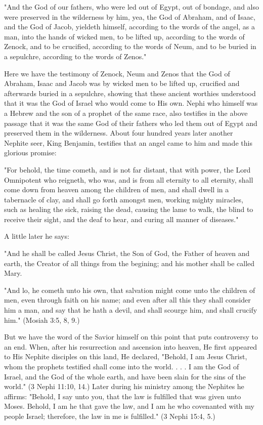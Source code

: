 "And the God of our fathers, who were led out of Egypt, out of bondage, and also were
preserved in the wilderness by him, yea, the God of Abraham, and of Isaac, and the God of
Jacob, yieldeth himself, according to the words of the angel, as a man, into the hands of
wicked men, to be lifted up, according to the words of Zenock, and to be crucified, according
to the words of Neum, and to be buried in a sepulchre, according to the words of Zenos."

Here we have the testimony of Zenock, Neum and Zenos that the God of Abraham, Isaac and
Jacob was by wicked men to be lifted up, crucified and afterwards buried in a sepulchre,
showing that these ancient worthies understood that it was the God of Israel who would come
to His own. Nephi who himself was a Hebrew and the son of a prophet of the same race, also
testifies in the above passage that it was the same God of their fathers who led them out of
Egypt and preserved them in the wilderness. About four hundred years later another Nephite
seer, King Benjamin, testifies that an angel came to him and made this glorious promise:

"For behold, the time cometh, and is not far distant, that with power, the Lord Omnipotent
who reigneth, who was, and is from all eternity to all eternity, shall come down from heaven
among the children of men, and shall dwell in a tabernacle of clay, and shall go forth
amongst men, working mighty miracles, such as healing the sick, raising the dead, causing
the lame to walk, the blind to receive their sight, and the deaf to hear, and curing all manner
of diseases."

A little later he says:

"And he shall be called Jesus Christ, the Son of God, the Father of heaven and earth, the
Creator of all things from the begining; and his mother shall be called Mary.

"And lo, he cometh unto his own, that salvation might come unto the children of men, even
through faith on his name; and even after all this they shall consider him a man, and say that
he hath a devil, and shall scourge him, and shall crucify him." (Mosiah 3:5, 8, 9.)

But we have the word of the Savior himself on this point that puts controversy to an end.
When, after his resurrection and ascension into heaven, He first appeared to His Nephite
disciples on this land, He declared, "Behold, I am Jesus Christ, whom the prophets testified
shall come into the world. . . . I am the God of Israel, and the God of the whole earth, and
have been slain for the sins of the world." (3 Nephi 11:10, 14.) Later during his ministry
among the Nephites he affirms: "Behold, I say unto you, that the law is fulfilled that was
given unto Moses. Behold, I am he that gave the law, and I am he who covenanted with my
people Israel; therefore, the law in me is fulfilled." (3 Nephi 15:4, 5.)


